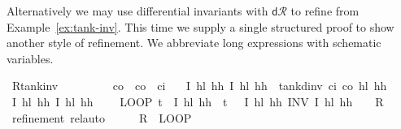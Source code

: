 \documentclass[envcountsame,envcountsect]{llncs}
\newcommand{\dR}{\mathsf{d}\mathcal{R}}
\begin{document}
\begin{example}\label{ex:tank-rinv}
  Alternatively we may use differential invariants with $\dR$ to
  refine  from
  Example~\ref{ex:tank-inv}. This time we supply a single structured
  proof to show another style of refinement.
  We %
  abbreviate long expressions with schematic variables.

\begin{isabellebody}
\isanewline
{}\isamarkupfalse%
\ R{\isacharunderscore}tank{\isacharunderscore}inv{\isacharcolon}\isanewline
\ \ \ {\isachardoublequoteopen}{}\ {\isasymle}\ {\isasymtau}{\isachardoublequoteclose}\ \ {\isachardoublequoteopen}{}\ {\isacharless}\ c\isactrlsub o{\isachardoublequoteclose}\ \ {\isachardoublequoteopen}c\isactrlsub o\ {\isacharless}\ c\isactrlsub i{\isachardoublequoteclose}\isanewline
\ \ \ {\isachardoublequoteopen}\isactrlbold {\isacharbrackleft}I\ h\isactrlsub l\ h\isactrlsub h{\isacharcomma}\ I\ h\isactrlsub l\ h\isactrlsub h\isactrlbold {\isacharbrackright}\ {\isasymge}\ tank{\isacharunderscore}dinv\ c\isactrlsub i\ c\isactrlsub o\ h\isactrlsub l\ h\isactrlsub h\ {\isasymtau}{\isachardoublequoteclose}\isanewline
{}\isamarkupfalse%
{\isacharminus}\isanewline
\ \ \isamarkupfalse%
\ {\isachardoublequoteopen}\isactrlbold {\isacharbrackleft}I\ h\isactrlsub l\ h\isactrlsub h{\isacharcomma}\ I\ h\isactrlsub l\ h\isactrlsub h\isactrlbold {\isacharbrackright}\ {\isasymge}\isanewline
\ \ \ LOOP\ {\isacharparenleft}{\isacharparenleft}t\ {\isacharcolon}{\isacharcolon}{\isacharequal}\ {}{\isacharparenright}{\isacharsemicolon}\isactrlbold {\isacharbrackleft}I\ h\isactrlsub l\ h\isactrlsub h\ {\isasymand}\ t\ {\isacharequal}\ {}{\isacharcomma}\ I\ h\isactrlsub l\ h\isactrlsub h\isactrlbold {\isacharbrackright}{\isacharparenright}\ INV\ I\ h\isactrlsub l\ h\isactrlsub h{\isachardoublequoteclose}\ {\isacharparenleft}\ {\isachardoublequoteopen}{\isacharunderscore}\ {\isasymge}\ {\isacharquery}R{\isachardoublequoteclose}{\isacharparenright}\isanewline
\ \ \ \ \isamarkupfalse%
\ {\isacharparenleft}refinement{\isacharcomma}\ rel{\isacharunderscore}auto{\isacharprime}{\isacharparenright}\isanewline
\ \ \isamarkupfalse%
\ \isamarkupfalse%
\ {\isachardoublequoteopen}{\isacharquery}R\ {\isasymge}\ LOOP\isanewline

\end{isabellebody}
\end{example}
\end{document}
